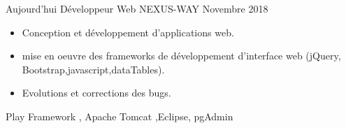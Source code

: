 %
%
%
\begin{experiences}
  \experience
    {Aujourd'hui}   {Développeur Web }{NEXUS-WAY}{}
    {Novembre 2018} {
                      \begin{itemize}
                       \item Conception et développement d'applications web.
                       \item mise en oeuvre des frameworks de développement d'interface web (jQuery, Bootstrap,javascript,dataTables).
                       
                        \item Evolutions et corrections des bugs.                         
                      \end{itemize}
                    }
                    {Play Framework , Apache Tomcat ,Eclipse, pgAdmin}
  \emptySeparator
  

\end{experiences}
